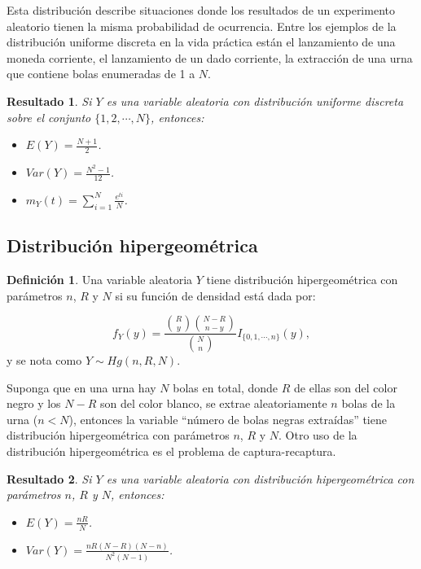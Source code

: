 \documentclass[
  12pt,
  spanish,
]{book}
\providecommand{\tightlist}{%
  \setlength{\itemsep}{0pt}\setlength{\parskip}{0pt}}
\newtheorem{proposition}{Resultado}[chapter]
\theoremstyle{definition}
\newtheorem{definition}{Definición}[chapter]
\theoremstyle{definition}
\theoremstyle{definition}
\theoremstyle{definition}
\theoremstyle{remark}
\begin{document}
Esta distribución describe situaciones donde los resultados de un experimento aleatorio tienen la misma probabilidad de ocurrencia. Entre los ejemplos de la distribución uniforme discreta en la vida práctica están el lanzamiento de una moneda corriente, el lanzamiento de un dado corriente, la extracción de una urna que contiene bolas enumeradas de 1 a \(N\).

\begin{proposition}
\protect\hypertarget{prp:unnamed-chunk-2}{}{\label{prp:unnamed-chunk-2} }Si \(Y\) es una variable aleatoria con distribución uniforme discreta sobre el conjunto \(\{1,2,\cdots,N\}\), entonces:

\begin{itemize}
\tightlist
\item
  \(E(Y)=\frac{N+1}{2}\).
\item
  \(Var(Y)=\frac{N^2-1}{12}\).
\item
  \(m_Y(t)=\sum_{i=1}^N\frac{e^{ti}}{N}\).
\end{itemize}
\end{proposition}

\hypertarget{distribuciuxf3n-hipergeomuxe9trica}{%
\subsection{Distribución hipergeométrica}\label{distribuciuxf3n-hipergeomuxe9trica}}

\begin{definition}
\protect\hypertarget{def:unnamed-chunk-3}{}{\label{def:unnamed-chunk-3} }Una variable aleatoria \(Y\) tiene distribución hipergeométrica con parámetros \(n\), \(R\) y \(N\) si su función de densidad está dada por:

\begin{equation}
f_Y(y)=\frac{\binom{R}{y}\binom{N-R}{n-y}}{\binom{N}{n}}I_{\{0,1,\cdots,n\}}(y),
\end{equation}
y se nota como \(Y\sim Hg(n,R,N)\).
\end{definition}

Suponga que en una urna hay \(N\) bolas en total, donde \(R\) de ellas son del color negro y los \(N-R\) son del color blanco, se extrae aleatoriamente
\(n\) bolas de la urna (\(n<N\)), entonces la variable ``número de bolas negras extraídas'' tiene distribución hipergeométrica con parámetros \(n\), \(R\) y
\(N\). Otro uso de la distribución hipergeométrica es el problema de captura-recaptura.

\begin{proposition}
\protect\hypertarget{prp:unnamed-chunk-4}{}{\label{prp:unnamed-chunk-4} }Si \(Y\) es una variable aleatoria con distribución hipergeométrica con parámetros \(n\), \(R\) y \(N\), entonces:

\begin{itemize}
\tightlist
\item
  \(E(Y)=\frac{nR}{N}\).
\item
  \(Var(Y)=\frac{nR(N-R)(N-n)}{N^2(N-1)}\).
\end{itemize}
\end{proposition}
\end{document}
